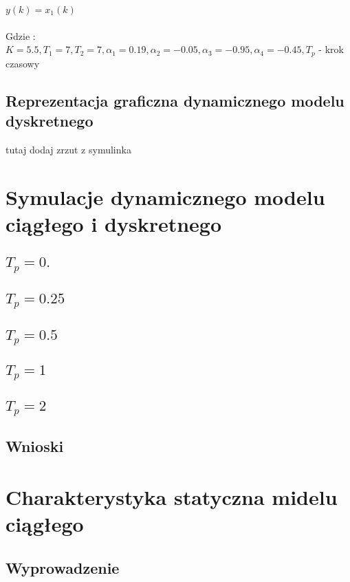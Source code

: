 \documentclass[a4paper, 11pt]{article}
\begin{document}
$y(k) = x_1(k)$
\\
\\
Gdzie : \\

$K  = 5.5, T_1 = 7, T_2 = 7, \alpha_1 = 0.19, \alpha_2 = -0.05, \alpha_3 = -0.95, \alpha_4 = -0.45, T_p$ - krok czasowy
\\


\subsection{Reprezentacja graficzna dynamicznego modelu dyskretnego}

tutaj dodaj zrzut z symulinka

\section{Symulacje dynamicznego modelu ciągłego i dyskretnego}
\subsection{$T_p = 0.$}

\subsection{$T_p = 0.25$}

\subsection{$T_p = 0.5$}

\subsection{$T_p = 1$}

\subsection{$T_p = 2$}
 
\subsection{Wnioski}

\section{Charakterystyka statyczna midelu ciągłego}
\subsection{Wyprowadzenie}
\end{document}
